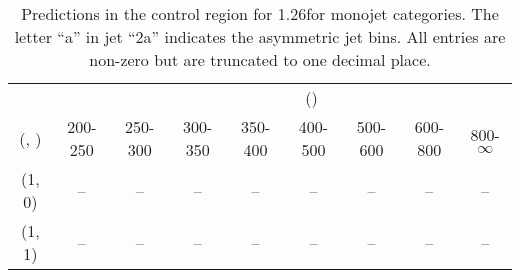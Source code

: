 \begin{table}[h!]
\tiny
\centering
\caption{Predictions in the \mj control region for 1.26\ifb for monojet categories. The letter ``a'' in jet \eg ``2a''  indicates the asymmetric jet bins. All entries are non-zero but are truncated to one decimal place.\label{tab:predsep_mu_wjetstolnuht_mono}}
\begin{tabular}
{ccccccccc}
	\hline\hline
&	& \multicolumn{8}{c}{\scalht (\gev)} \\ 
	 (\njet,  \nb) & 200-250 & 250-300 & 300-350 & 350-400 & 400-500 & 500-600 & 600-800 & 800-$\infty$ \\ [0.8ex] 
\hline
	(1, 0) & -- & -- & -- & -- & -- & -- & -- & -- \\[0.5ex] 
	(1, 1) & -- & -- & -- & -- & -- & -- & -- & -- \\[0.5ex] 
	\hline
	\hline
\end{tabular}
\end{table}
